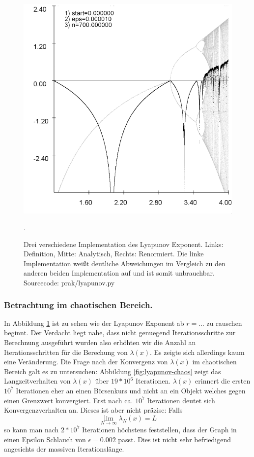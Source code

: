 \documentclass{scrartcl}
\begin{document}
\begin{figure}
\includegraphics[scale=0.28]{iteration/lyapunov-3}
\caption{Drei verschiedene Implementation des Lyapunov Exponent. Links: Definition, Mitte: Analytisch, Rechts: Renormiert. Die linke Implementation weißt deutliche Abweichungen im Vergleich zu den anderen beiden Implementation auf und ist somit unbrauchbar. Sourcecode: prak/lyapunov.py}. 
\label{fig:lyapunov}
\end{figure}
 
\subsubsection{Betrachtung im chaotischen Bereich.}
In Abbildung \ref{fig:lyapunov} ist zu sehen wie der Lyapunov Exponent ab $r=...$ zu rauschen beginnt. 
Der Verdacht liegt nahe, dass nicht genuegend Iterationsschritte zur Berechnung ausgeführt wurden also erhöhten wir die Anzahl an Iterationsschritten für die Berechung von $\lambda(x)$. Es zeigte sich allerdings kaum eine Veränderung. Die Frage nach der Konvergenz von $\lambda(x)$ im chaotischen Bereich galt es zu untersuchen: Abbildung \ref{fig:lyapunov-chaos} zeigt das Langzeitverhalten von $\lambda(x)$ über $19*10^6$ Iterationen. $\lambda(x)$ erinnert die ersten $10^7$ Iterationen eher an einen Börsenkurs und nicht an ein Objekt welches gegen einen Grenzwert konvergiert. Erst nach ca. $10^7$ Iterationen deutet sich Konvergenzverhalten an. Dieses ist aber nicht präzise: Falls 
$$
\lim_{N \rightarrow \infty} \lambda_N(x) = L
$$
so kann man nach $2*10^7$ Iterationen höchstens feststellen, dass der Graph in einen Epsilon Schlauch von $\epsilon=0.002$ passt. Dies ist nicht sehr befriedigend angesichts der massiven Iterationslänge.  
\end{document}
